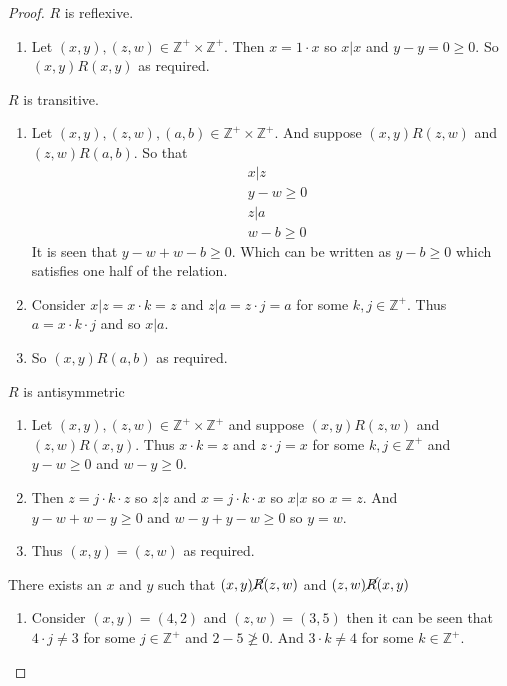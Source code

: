 \documentclass{article}
\begin{document}
    \begin{proof}
        $R$ is reflexive.
        \begin{enumerate}[label=\quad\quad, leftmargin=*]
            \item 
            Let $(x,y),(z,w)\in\mathbb{Z}^+\times\mathbb{Z}^+$. Then $x = 1\cdot x$ so $x|x$ and $y-y = 0\geq 0$.
            So $(x,y)R(x,y)$ as required.
        \end{enumerate}
        $R$ is transitive.
        \begin{enumerate}[label=\quad\quad, leftmargin=*]
            \item 
            Let $(x,y),(z,w),(a,b)\in\mathbb{Z}^+\times\mathbb{Z}^+$. And suppose $(x,y)R(z,w)$
            and $(z,w)R(a,b)$. So that 
            \begin{align*}
                &x|z \\
                &y-w\geq 0\\
                &z|a\\
                &w-b\geq 0
            \end{align*}
            It is seen that $y-w+w-b\geq 0$. Which can be written as $y-b\geq 0$ which satisfies one
            half of the relation.
            \item 
            Consider $x|z = x\cdot k = z$ and $z|a = z\cdot j = a$ for some $k,j\in\mathbb{Z}^+$.
            Thus $a=x\cdot k\cdot j$ and so $x|a$.
            \item
            So $(x,y)R(a,b)$ as required.
        \end{enumerate}
        $R$ is antisymmetric 
        \begin{enumerate}[label=\quad\quad, leftmargin=*]
            \item 
            Let $(x,y),(z,w)\in\mathbb{Z}^+\times\mathbb{Z}^+$ and suppose $(x,y)R(z,w)$
            and $(z,w)R(x,y)$. Thus $x\cdot k = z$ and $z\cdot j=x$ for some $k,j\in\mathbb{Z}^+$
            and $y-w\geq 0$ and $w-y\geq 0$.
            \item
            Then $z=j\cdot k\cdot z$ so $z|z$ and $x=j\cdot k\cdot x$ so $x|x$ so $x=z$. And 
            $y-w+w-y\geq 0$ and $w-y+y-w\geq 0$ so $y=w$.
            \item
            Thus $(x,y)=(z,w)$ as required.
        \end{enumerate}
        There exists an $x$ and $y$ such that $(x,y)\cancel{R}(z,w)$ and $(z,w)\cancel{R}(x,y)$
        \begin{enumerate}[label=\quad\quad, leftmargin=*]
            \item 
            Consider $(x,y)=(4,2)$ and $(z,w)=(3,5)$ then it can be seen that $4\cdot j\neq 3$ for some
            $j\in\mathbb{Z}^+$ and $2-5\ngeq 0$. And $3\cdot k\neq 4$ for some $k\in\mathbb{Z}^+$.
        \end{enumerate}
    \end{proof}
\end{document}

